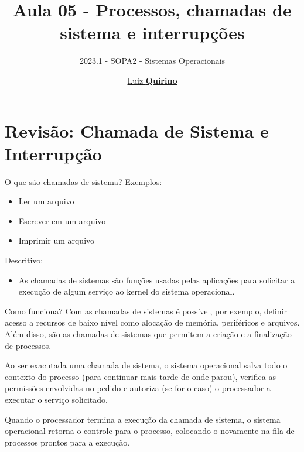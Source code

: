 \documentclass{beamer}
\title{Aula 05 - Processos, chamadas de sistema e interrupções}
\subtitle{2023.1 - SOPA2 - Sistemas Operacionais}
\author{\href{mailto:luiz.quirino@ifsp.edu.br}{Luiz \textbf{Quirino}}}
\newcommand{\hrefcol}[2]{\textcolor{cyan}{\href{#1}{#2}}}
\begin{document}
\maketitle

%
%




\section{Revisão: Chamada de Sistema e Interrupção}

\begin{frame}{O que são chamadas de sistema?}
Exemplos:
\begin{itemize}
\item Ler um arquivo
\item Escrever em um arquivo
\item Imprimir um arquivo
\end{itemize}
Descritivo:
\begin{itemize}
\item As chamadas de sistemas são funções usadas pelas aplicações para solicitar a execução de algum serviço ao kernel do sistema operacional.
\end{itemize}

\end{frame}

\begin{frame}{Como funciona?}\justifying
      Com as chamadas de sistemas é possível, por exemplo, definir acesso a recursos de baixo nível como alocação de memória, periféricos e arquivos. Além disso, são as chamadas de sistemas que permitem a criação e a finalização de processos.

Ao ser exacutada uma chamada de sistema, o sistema operacional salva todo o contexto do processo (para continuar mais tarde de onde parou), verifica as permissões envolvidas no pedido e autoriza (se for o caso) o processador a executar o serviço solicitado.

Quando o processador termina a execução da chamada de sistema, o sistema operacional retorna o controle para o processo, colocando-o novamente na fila de processos prontos para a execução.
\end{frame}
\end{document}
